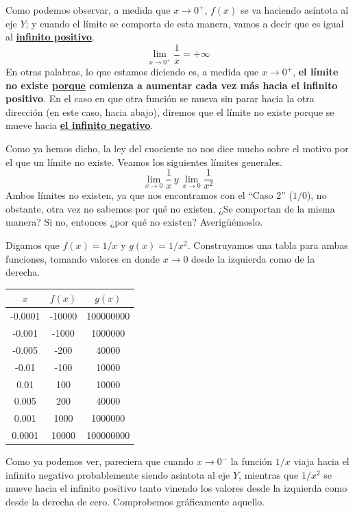 \documentclass[12pt]{article}
\begin{document}
Como podemos observar, a medida que $x \to 0^{+}$, $f(x)$ se va haciendo asíntota al eje $Y$; y cuando el límite se comporta de esta manera, vamos a decir que es igual al \textbf{\underline{infinito positivo}}.
\[\lim_{x \to 0^{+}} \frac{1}{x} = + \infty\]
En otras palabras, lo que estamos diciendo es, a medida que $x \to 0^{+}$, \textbf{el límite no existe \underline{porque} comienza a aumentar cada vez más hacia el infinito positivo}. En el caso en que otra función se mueva sin parar hacia la otra dirección (en este caso, hacia abajo), diremos que el límite no existe porque se mueve hacia \textbf{\underline{el infinito negativo}}.

Como ya hemos dicho, la ley del cuociente no nos dice mucho sobre el motivo por el que un límite no existe. Veamos los siguientes límites generales.
\[\lim_{x \to 0} \frac{1}{x} \, y \, \lim_{x \to 0} \frac{1}{x^{2}}\]
Ambos límites no existen, ya que nos encontramos con el ``Caso 2'' ($1/0$), no obstante, otra vez no sabemos por qué no existen. ¿Se comportan de la misma manera? Si no, entonces ¿por qué no existen? Averigüémoslo.

Digamos que $f(x) = 1/x$ y $g(x) = 1/x^{2}$. Construyamos una tabla para ambas funciones, tomando valores en donde $x \to 0$ desde la izquierda como de la derecha.

\begin{table}[hbt!]
\centering

\begin{tabular}{c | c | c}
$x$ & $f(x)$ & $g(x)$\\
\hline
-0.0001 & -10000 & 100000000\\
-0.001 & -1000 & 1000000\\
-0.005 & -200 & 40000\\
-0.01 & -100 & 10000\\
0.01 & 100 & 10000\\
0.005 & 200 & 40000\\
0.001 & 1000 & 1000000\\
0.0001 & 10000 & 100000000\\
\end{tabular}

\end{table}

Como ya podemos ver, pareciera que cuando $x \to 0^{-}$ la función $1/x$ viaja hacia el infinito negativo probablemente siendo asintota al eje $Y$, mientras que $1/x^{2}$ se mueve hacia el infinito positivo tanto vinendo los valores desde la izquierda como desde la derecha de cero. Comprobemos gráficamente aquello.
\end{document}
